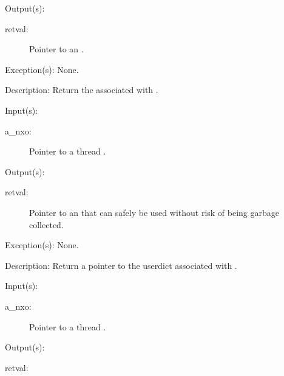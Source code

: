 \begin{capi}
\begin{capilist}
\begin{description}
		\end{description}
	\item[Output(s): ]
		\begin{description}\item[]
		\item[retval: ]
			Pointer to an .
		\end{description}
	\item[Exception(s): ] None.
	\item[Description: ]
		Return the  associated with .
	\end{capilist}
\label{nxo_thread_userdict_get}
	\begin{capilist}
	\item[Input(s): ]
		\begin{description}\item[]
		\item[a\_nxo: ]
			Pointer to a thread .
		\end{description}
	\item[Output(s): ]
		\begin{description}\item[]
		\item[retval: ]
			Pointer to an  that can safely be used
			without risk of being garbage collected.
		\end{description}
	\item[Exception(s): ] None.
	\item[Description: ]
		Return a pointer to the userdict associated with .
	\end{capilist}
\label{nxo_thread_errordict_get}
	\begin{capilist}
	\item[Input(s): ]
		\begin{description}\item[]
		\item[a\_nxo: ]
			Pointer to a thread \classname{nxo}.
		\end{description}
	\item[Output(s): ]
		\begin{description}\item[]
		\item[retval: ]

\end{description}
\end{capilist}
\end{capi}
